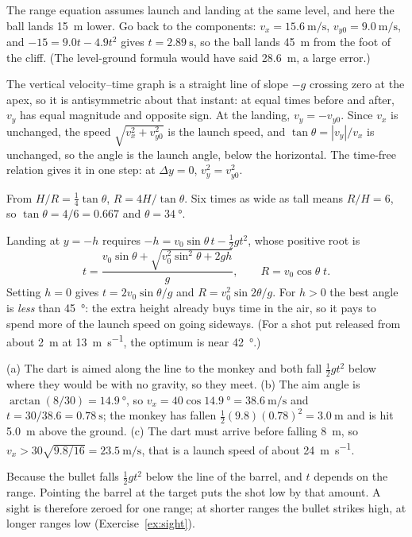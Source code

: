 \documentclass[11pt,twoside,openany]{book}
\begin{document}
\begin{description}[leftmargin=2.6em,itemsep=3pt,style=sameline]
  \item[3.38] The range equation assumes launch and landing at the same level, and here the ball lands \SI{15}{\metre} lower. Go back to the components: $v_x = \SI{15.6}{\metre\per\second}$, $v_{y0} = \SI{9.0}{\metre\per\second}$, and $-15 = 9.0t - 4.9t^2$ gives $t = \SI{2.89}{\second}$, so the ball lands \SI{45}{\metre} from the foot of the cliff. (The level-ground formula would have said \SI{28.6}{\metre}, a large error.)
  \item[3.39] The vertical velocity--time graph is a straight line of slope $-g$ crossing zero at the apex, so it is antisymmetric about that instant: at equal times before and after, $v_y$ has equal magnitude and opposite sign. At the landing, $v_y = -v_{y0}$. Since $v_x$ is unchanged, the speed $\sqrt{v_x^2+v_{y0}^2}$ is the launch speed, and $\tan\theta = |v_y|/v_x$ is unchanged, so the angle is the launch angle, below the horizontal. The time-free relation gives it in one step: at $\Delta y = 0$, $v_y^2 = v_{y0}^2$.
  \item[3.40] From $H/R = \tfrac14\tan\theta$, $R = 4H/\tan\theta$. Six times as wide as tall means $R/H = 6$, so $\tan\theta = 4/6 = \num{0.667}$ and $\theta = \SI{34}{\degree}$.
  \item[3.41] Landing at $y = -h$ requires $-h = v_0\sin\theta\,t - \tfrac12 gt^2$, whose positive root is
  \[
  t = \frac{v_0\sin\theta + \sqrt{v_0^2\sin^2\theta + 2gh}}{g}, \qquad R = v_0\cos\theta\;t .
  \]
  Setting $h = 0$ gives $t = 2v_0\sin\theta/g$ and $R = v_0^2\sin2\theta/g$. For $h > 0$ the best angle is \emph{less} than \SI{45}{\degree}: the extra height already buys time in the air, so it pays to spend more of the launch speed on going sideways. (For a shot put released from about \SI{2}{\metre} at \SI{13}{\metre\per\second}, the optimum is near \SI{42}{\degree}.)
  \item[3.42] (a) The dart is aimed along the line to the monkey and both fall $\tfrac12 gt^2$ below where they would be with no gravity, so they meet. (b) The aim angle is $\arctan(8/30) = \SI{14.9}{\degree}$, so $v_x = 40\cos\SI{14.9}{\degree} = \SI{38.6}{\metre\per\second}$ and $t = 30/38.6 = \SI{0.78}{\second}$; the monkey has fallen $\tfrac12(9.8)(0.78)^2 = \SI{3.0}{\metre}$ and is hit \SI{5.0}{\metre} above the ground. (c) The dart must arrive before falling \SI{8}{\metre}, so $v_x > 30\sqrt{9.8/16} = \SI{23.5}{\metre\per\second}$, that is a launch speed of about \SI{24}{\metre\per\second}.
  \item[3.43] Because the bullet falls $\tfrac12 gt^2$ below the line of the barrel, and $t$ depends on the range. Pointing the barrel at the target puts the shot low by that amount. A sight is therefore zeroed for one range; at shorter ranges the bullet strikes high, at longer ranges low (Exercise~\ref{ex:sight}).

\end{description}
\end{document}
